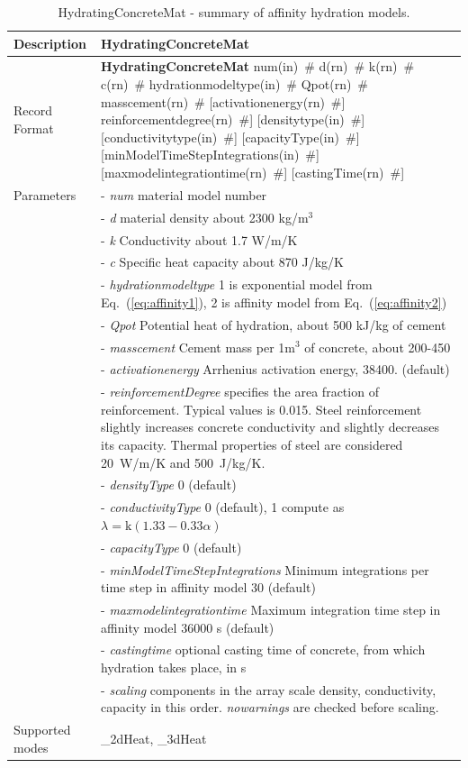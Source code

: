 \documentclass[a4paper]{article}
\newcommand{\descitem}[1]{{\noindent \bf #1}}
\newcommand{\elemparam}[2]{{{#1\tiny (#2)}~\#}}
\newcommand{\param}[1]{{\it #1}}
\newcommand{\refeq}[1]{Eq.~(\ref{#1})}
\begin{document}
\begin{table}[!htb]
\begin{tabular}{|l|p{9cm}|}
\hline
Description & HydratingConcreteMat\\
\hline
Record Format & \descitem{HydratingConcreteMat} \elemparam{num}{in} \elemparam{d}{rn} \elemparam{k}{rn} \elemparam{c}{rn} \elemparam{hydrationmodeltype}{in} \elemparam{Qpot}{rn} \elemparam{masscement}{rn} [\elemparam{activationenergy}{rn}] \elemparam{reinforcementdegree}{rn}] [\elemparam{densitytype}{in}] [\elemparam{conductivitytype}{in}] [\elemparam{capacityType}{in}]   [\elemparam{minModelTimeStepIntegrations}{in}]  [\elemparam{maxmodelintegrationtime}{rn}] [\elemparam{castingTime}{rn}]\\
Parameters &- \param{num} material model number\\
&- \param{d} material density about 2300 kg/m$^3$\\
&- \param{k} Conductivity about 1.7 W/m/K\\
&- \param{c} Specific heat capacity about 870 J/kg/K\\
&- \param{hydrationmodeltype} 1 is exponential model from \refeq{eq:affinity1}, 2 is affinity model from \refeq{eq:affinity2}\\
&- \param{Qpot} Potential heat of hydration, about 500 kJ/kg of cement\\
&- \param{masscement} Cement mass per 1m$^3$ of concrete, about 200-450\\
&- \param{activationenergy} Arrhenius activation energy, 38400. (default)\\
&- \param{reinforcementDegree} specifies the area fraction of reinforcement. Typical values is 0.015. Steel reinforcement slightly increases concrete conductivity and slightly decreases its capacity. Thermal properties of steel are considered 20~W/m/K and 500~J/kg/K.\\
&- \param{densityType} 0 (default)\\
&- \param{conductivityType} 0 (default), 1 compute as $\lambda = \textrm{k} (1.33-0.33\alpha)$ \cite{Ruiz:01}\\
&- \param{capacityType} 0 (default)\\
&- \param{minModelTimeStepIntegrations} Minimum integrations per time step in affinity model 30 (default)\\
&- \param{maxmodelintegrationtime} Maximum integration time step in affinity model 36000 s (default)\\
&- \param{castingtime} optional casting time of concrete, from which hydration takes place, in s\\
&- \param{scaling} components in the array scale density, conductivity, capacity in this order. \param{nowarnings} are checked before scaling.\\
Supported modes& \_2dHeat, \_3dHeat\\
\hline
\end{tabular}
\caption{HydratingConcreteMat - summary of affinity hydration models.}
\label{Affinity1_table}
\end{table}
\end{document}

